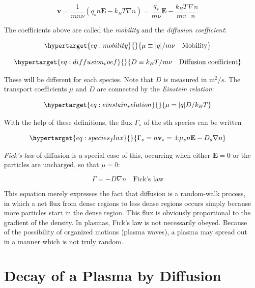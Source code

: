 \documentclass[
  notoc %
]{tufte-book}
\begin{document}
\[
\mathbf{v} = \frac{1}{mn\nu}(q_sn\mathbf{E} - k_B T \nabla n) = \frac{q_s}{m\nu}\mathbf{E} - \frac{k_B T}{mv}\frac{\nabla n}{n}
\]

The coefficients above are called the \emph{mobility} and the
\emph{diffusion coefficient}:

\begin{equation}\protect\hypertarget{eq:mobility}{}{
\mu\equiv |q|/m\nu\quad\text{Mobility}
}\label{eq:mobility}\end{equation}

\begin{equation}\protect\hypertarget{eq:diffusion_coef}{}{
D\equiv k_B T/ m\nu\quad\text{Diffusion coefficient}
}\label{eq:diffusion_coef}\end{equation}

These will be different for each species. Note that \(D\) is measured in
\(\text{m}^2/s\). The transport coefficients \(\mu\) and \(D\) are
connected by the \emph{Einstein relation}:

\begin{equation}\protect\hypertarget{eq:einstein_relation}{}{
\mu = |q|D/k_B T
}\label{eq:einstein_relation}\end{equation}

With the help of these definitions, the flux \(\Gamma_s\) of the sth
species can be written

\begin{equation}\protect\hypertarget{eq:species_flux}{}{
\Gamma_s = n\mathbf{v}_s = \pm \mu_s n\mathbf{E} - D_s\nabla n
}\label{eq:species_flux}\end{equation}

\emph{Fick's law} of diffusion is a special case of this, occurring when
either \(\mathbf{E}=0\) or the particles are uncharged, so that
\(\mu=0\):

\[
\Gamma = -D\nabla n\quad\text{Fick's law}
\]

This equation merely expresses the fact that diffusion is a random-walk
process, in which a net flux from dense regions to less dense regions
occurs simply because more particles start in the dense region. This
flux is obviously proportional to the gradient of the density. In
plasmas, Fick's law is not necessarily obeyed. Because of the
possibility of organized motions (plasma waves), a plasma may spread out
in a manner which is not truly random.

\hypertarget{decay-of-a-plasma-by-diffusion}{%
\section{Decay of a Plasma by
Diffusion}\label{decay-of-a-plasma-by-diffusion}}
\end{document}
